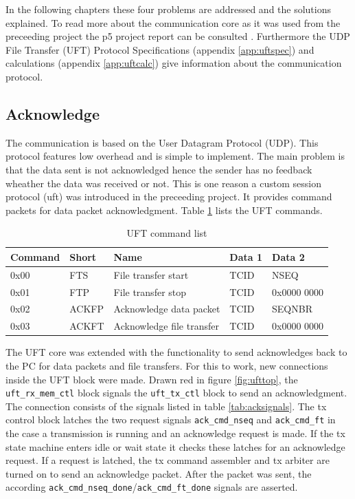 In the following chapters these four problems are addressed and the solutions
explained. To read more about the communication core as it was used from the
preceeding project the p5 project report can be consulted \cite{p5report}.
Furthermore the UDP File Transfer (UFT) Protocol Specifications (appendix 
\ref{app:uftspec}) and calculations (appendix \ref{app:uftcalc}) give
information about the communication protocol.

\subsection{Acknowledge}
The communication is based on the User Datagram Protocol (UDP). This protocol
features low overhead and is simple to implement. The main problem is that the
data sent is not acknowledged hence the sender has no feedback wheather the data
was received or not. This is one reason a custom session protocol (\gls{uft})
was introduced in the preceeding project. It provides command packets for data
packet acknowledgment. Table \ref{tab:uftcommandlist} lists the UFT commands.


\begin{table}[b!]
    \centering
    \begin{tabular}{l l l l l}
        \toprule
        Command & Short & Name & Data 1 & Data 2 \\
        \midrule
        0x00 & FTS & 
        File transfer start & TCID & NSEQ
        \\
        0x01 & FTP &
        File transfer stop & TCID & 0x0000 0000
        \\
        0x02 & ACKFP &
        Acknowledge data packet & TCID & SEQNBR
        \\
        0x03 & ACKFT &
        Acknowledge file transfer & TCID & 0x0000 0000
        \\
        \bottomrule
    \end{tabular}
    \caption{UFT command list}
    \label{tab:uftcommandlist}
\end{table}

The UFT core was extended with the functionality to send acknowledges back to
the PC for data packets and file transfers. For this to work, new connections
inside the UFT block were made. Drawn red in figure \ref{fig:ufttop}, the 
\texttt{uft\_rx\_mem\_ctl} block signals the \texttt{uft\_tx\_ctl} block to send
an acknowledgment. The connection consists of the signals listed in table 
\ref{tab:acksignals}. The tx control block latches the two request signals 
\texttt{ack\_cmd\_nseq} and \texttt{ack\_cmd\_ft} in the case a transmission is
running and an acknowledge request is made. If the tx state machine enters idle
or wait state it checks these latches for an acknowledge request. If a request
is latched, the tx command assembler and tx arbiter are turned on to send an
acknowledge packet. After the packet was sent, the according 
\texttt{ack\_cmd\_nseq\_done}/\texttt{ack\_cmd\_ft\_done} signals are asserted.


